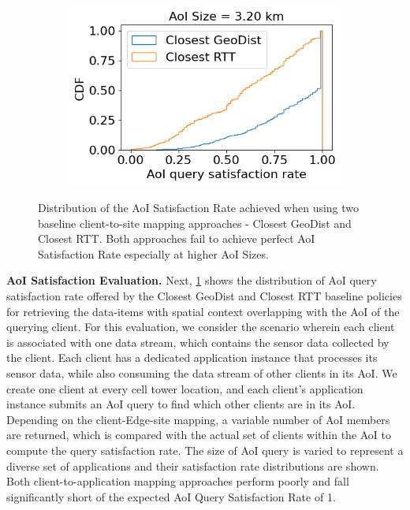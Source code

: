 \begin{figure}
\begin{subfigure}{0.333\textwidth}
  \includegraphics[width=\linewidth]{figures/mechanisms/spatial_ctx_mgmt/aoi_satisfaction_rate_cdf_AOI_3.200_km.png}
  \caption{}
\end{subfigure}
\caption{Distribution of the AoI Satisfaction Rate achieved when using two baseline client-to-site mapping approaches - Closest GeoDist and Closest RTT. Both approaches fail to achieve perfect AoI Satisfaction Rate especially at higher AoI Sizes.}
\label{fig:aoi_satisfaction_rate_eval}
\end{figure}

\par \noindent \textbf{AoI Satisfaction Evaluation.} Next, \cref{fig:aoi_satisfaction_rate_eval} shows the distribution of AoI query satisfaction rate offered by the Closest GeoDist and Closest RTT baseline policies for retrieving the data-items with spatial context overlapping with the AoI of the querying client. For this evaluation, we consider the scenario wherein each client is associated with one data stream, which contains the sensor data collected by the client. Each client has a dedicated application instance that processes its sensor data, while also consuming the data stream of other clients in its AoI. We create one client at every cell tower location, and each client's application instance submits an AoI query to find which other clients are in its AoI. Depending on the client-Edge-site mapping, a variable number of AoI members are returned, which is compared with the actual set of clients within the AoI to compute the query satisfaction rate. The size of AoI query is varied to represent a diverse set of applications and their satisfaction rate distributions are shown. Both client-to-application mapping approaches perform poorly and fall significantly short of the expected AoI Query Satisfaction Rate of 1.

